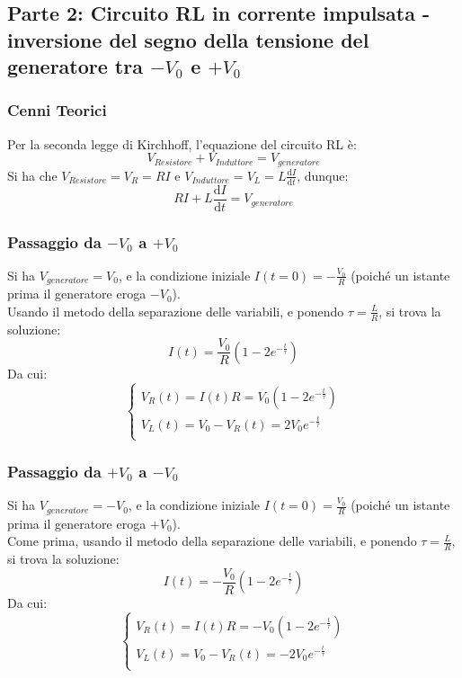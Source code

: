 \clearpage
\subsection{Parte 2: Circuito RL in corrente impulsata - inversione del segno della tensione del generatore tra $-V_0$ e $+V_0$}

\subsubsection{Cenni Teorici}
%
Per la seconda legge di Kirchhoff, l'equazione del circuito RL è:
$$ V_{Resistore} + V_{Induttore} = V_{generatore} $$
Si ha che $ V_{Resistore} = V_R = RI$ e $ V_{Induttore} = V_L = L \frac{\mathrm d I }{\mathrm d t} $, dunque:
$$ RI + L \frac{\mathrm d I }{\mathrm d t} = V_{generatore} $$
%
\subsubsection*{Passaggio da $-V_0$ a $+V_0$}
Si ha $V_{generatore} = V_0$, e la condizione iniziale $I(t=0) = -\frac{V_0}{R} $ (poiché un istante prima il generatore eroga $-V_0$).\\
Usando il metodo della separazione delle variabili, e ponendo $\tau = \frac{L}{R} $, si trova la soluzione:
$$ I(t) = \frac{V_0}{R}(1-2e^{-\frac{t}{\tau}})$$
Da cui:
\[
  \begin{cases}
    V_R(t) = I(t) R = V_0(1-2e^{-\frac{t}{\tau}})\\
    V_L(t) = V_0 - V_R(t) = 2 V_0 e^{-\frac{t}{\tau}}\\
  \end{cases}
\]


\subsubsection*{Passaggio da $+V_0$ a $-V_0$}
Si ha $V_{generatore} = -V_0$, e la condizione iniziale $I(t=0) = \frac{V_0}{R} $ (poiché un istante prima il generatore eroga $+V_0$).\\
Come prima, usando il metodo della separazione delle variabili, e ponendo $\tau = \frac{L}{R} $, si trova la soluzione:
$$ I(t) = -\frac{V_0}{R}(1-2e^{-\frac{t}{\tau}})$$
Da cui:
\[
  \begin{cases}
    V_R(t) = I(t) R = -V_0(1-2e^{-\frac{t}{\tau}})\\
    V_L(t) = V_0 - V_R(t) = -2 V_0 e^{-\frac{t}{\tau}}\\
  \end{cases}
\]

